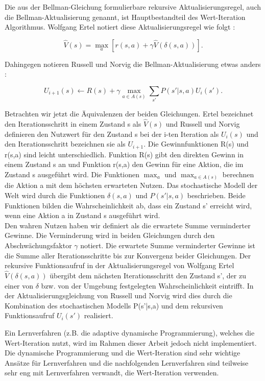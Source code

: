Die aus der Bellman-Gleichung formulierbare rekursive Aktualisierungsregel, auch die Bellman-Aktualisierung genannt, ist Hauptbestandteil des Wert-Iteration Algorithmus. Wolfgang Ertel notiert diese Aktualisierungsregel wie folgt \cite[294]{Ertel}:

\begin{equation}
\hat{V}(s) = \max_a [r(s,a) + \gamma \hat{V}(\delta(s,a))].
\end{equation}

Dahingegen notieren Russell und Norvig die Bellman-Aktualisierung etwas anders \cite[760]{Russell}:

\begin{equation}
U_{i+1}(s) \leftarrow R(s) + \gamma \max_{a \in A(s)} \sum_{s'} P(s'|s,a)U_i(s').
\end{equation} 

Betrachten wir jetzt die Äquivalenzen der beiden Gleichungen. Ertel bezeichnet den Iterationsschritt in einem Zustand s als $\hat{V}(s)$ und Russell und Norvig definieren den Nutzwert für den Zustand s bei der i-ten Iteration als $U_{i}(s)$ und den Iterationsschritt bezeichnen sie als $U_{i+1}$. Die Gewinnfunktionen R(s) und r(s,a) sind leicht unterschiedlich. Funktion R(s) gibt den direkten Gewinn in einem Zustand s an und Funktion r(s,a) den Gewinn für eine Aktion, die im Zustand s ausgeführt wird. Die Funktionen $\max_a$ und $\max_{a \in A(s)}$ berechnen die Aktion a mit dem höchsten erwarteten Nutzen. Das stochastische Modell der Welt wird durch die Funktionen $\delta(s,a)$ und $P(s'|s,a)$ beschrieben. Beide Funktionen bilden die Wahrscheinlichkeit ab, dass ein Zustand s' erreicht wird, wenn eine Aktion a in Zustand s ausgeführt wird. \\

Den wahren Nutzen haben wir definiert als die erwartete Summe verminderter Gewinne. Die Verminderung wird in beiden Gleichungen durch den Abschwächungsfaktor $\gamma$ notiert. Die erwartete Summe verminderter Gewinne ist die Summe aller Iterationsschritte bis zur Konvergenz beider Gleichungen. Der rekursive Funktionsaufruf in der Aktualisierungsregel von Wolfgang Ertel $\hat{V}(\delta(s,a))$ übergibt dem nächsten Iterationsschritt den Zustand s', der zu einer von $\delta$ bzw. von der Umgebung festgelegten Wahrscheinlichkeit eintrifft. In der Aktualisierungsgleichung von Russell und Norvig wird dies durch die Kombination des stochastischen Modells P(s'|s,a) und dem rekursiven Funktionsaufruf $U_i(s')$ realisiert.
\newpage

Ein Lernverfahren (z.B. die adaptive dynamische Programmierung), welches die Wert-Iteration nutzt, wird im Rahmen dieser Arbeit jedoch nicht implementiert. Die dynamische Programmierung und die Wert-Iteration sind sehr wichtige Ansätze für Lernverfahren und die nachfolgenden Lernverfahren sind teilweise sehr eng mit Lernverfahren verwandt, die Wert-Iteration verwenden. \\

